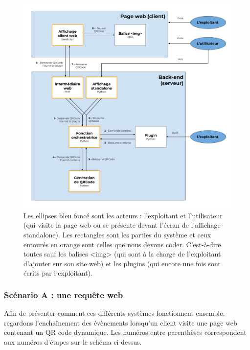 \documentclass[a4paper,12pt]{article}
\begin{document}
\begin{figure}[H]
\begin{center}
  \includegraphics[width=.8\textwidth]{Organigramme QRCode.png}
  \caption{Les ellipses bleu foncé sont les acteurs : l'exploitant et l'utilisateur (qui visite la page web ou se présente devant l'écran de l'affichage standalone). Les rectangles sont les parties du système et ceux entourés en orange sont celles que nous devons coder. C'est-à-dire toutes sauf les balises <img> (qui sont à la charge de l'exploitant d'ajouter sur son site web) et les plugins (qui encore une fois sont écrits par l'exploitant).}
\end{center}
\end{figure}

\subsubsection{Scénario A : une requête web}
\label{scen:1A}

Afin de présenter comment ces différents systèmes fonctionnent ensemble, regardons l'enchaînement des évènements lorsqu'un client visite une page web contenant un QR code dynamique. Les numéros entre parenthèses correspondent aux numéros d'étapes sur le schéma ci-dessus.\\
\end{document}
